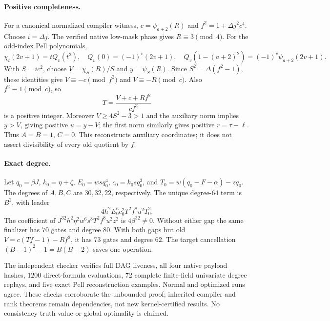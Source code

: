 \paragraph{Positive completeness.}
For a canonical normalized compiler witness,
$c=\psi_{a+2}(R)$ and $f^2=1+\Delta j^2c^4$. Choose $i=\Delta j$.
The verified native low-mask phase gives $R\equiv3\pmod4$.
For the odd-index Pell polynomials,
\[
 \chi_t(2v+1)=tQ_v(t^2),\quad Q_v(0)=(-1)^v(2v+1),\quad
 Q_v(1-(a+2)^2)=(-1)^v\psi_{a+2}(2v+1).
\]
With $S=ic^2$, choose $V=\chi_S(R)/S$ and $y=\psi_S(R)$.
Since $S^2=\Delta(f^2-1)$, these identities give
$V\equiv-c\pmod{f^2}$ and $V\equiv-R\pmod c$. Also
$f^2\equiv1\pmod c$, so
\[
                 T=\frac{V+c+Rf^2}{cf^2}
\]
is a positive integer. Moreover $V\geq4S^2-3>1$ and the auxiliary
norm implies $y>V$, giving positive $u=y-V$; the first norm similarly
gives positive $r=\tau-\ell$. Thus $A=B=1$, $C=0$.
This reconstructs auxiliary coordinates; it does not assert divisibility
of every old quotient by $f$.

\paragraph{Exact degree.}
Let $q_0=\beta J$, $k_0=\eta+\zeta$,
$E_0=wsq_0^4$, $c_0=k_0sq_0^3$, and
$T_0=w(q_0-F-\alpha)-zq_0$.
The degrees of $A,B,C$ are $30,32,22$, respectively.
The unique degree-$64$ term is $B^2$, with leader
\[
               4h^2E_0^6c_0^2T^2f^8u^2T_0^2.
\]
The coefficient of
$J^{32}h^2\eta^2w^6s^8T^2f^8u^2z^2$ is $4\beta^{32}\ne0$.
Without either gap the same finalizer has $70$ gates and degree $80$.
With both gaps but old $V=c(Tf-1)-Rf^2$, it has $73$ gates and degree
$62$. The target cancellation $(B-1)^2-1=B(B-2)$ saves one operation.

The independent checker verifies full DAG liveness, all four native
payload hashes, $1200$ direct-formula evaluations, $72$ complete
finite-field univariate degree replays, and five exact Pell
reconstruction examples. Normal and optimized runs agree. These checks
corroborate the unbounded proof; inherited compiler and rank theorems
remain dependencies, not new kernel-certified results. No consistency
truth value or global optimality is claimed.
